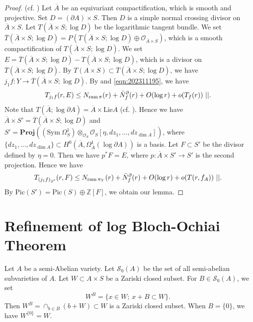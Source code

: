 \documentclass[11pt,english]{smfart}
\theoremstyle{plain}
\theoremstyle{definition}
\theoremstyle{remark}
\numberwithin{equation}{section}
\theoremstyle{plain}
\newcommand{\pN}[1]{\bar{N}_{#1}^{\partial}}
\newcommand{\ram}{{\rm ram}\,}
\begin{document}
	\begin{proof}
		(cf. \cite[Lemma 2]{Yam15})
		Let $\overline{A}$ be an equivariant compactification, which is smooth and projective.
		Set $D=(\partial A)\times S$.
		Then $D$ is a simple normal crossing divisor on $\overline{A}\times S$.
		Let $T(\overline{A}\times S;\log D)$ be the logarithmic tangent bundle.
		We set $\overline{T}(\overline{A}\times S;\log D)=P(T(\overline{A}\times S;\log D)\oplus \mathcal{O}_{\overline{A}\times S})$, which is a smooth compactification of $T(\overline{A}\times S;\log D)$.
		We set $E=\overline{T}(\overline{A}\times S;\log D)-T(\overline{A}\times S;\log D)$, which is a divisor on $\overline{T}(\overline{A}\times S;\log D)$.
		By $T(A\times S)\subset \overline{T}(\overline{A}\times S;\log D)$, we have $j_1f:Y\to \overline{T}(\overline{A}\times S;\log D)$.
		By \cite[(2.4.8)]{Yam04} and \eqref{eqn:202311195}, we have 
		$$
		T_{j_1f}(r,E)\leq N_{\ram \pi}(r)+\pN{f}(r)+O(\log r)+o(T_f(r))\ ||.
		$$ 
		Note that $T(\overline{A};\log\partial A)=\overline{A}\times \mathrm{Lie}A$ (cf. \cite[Prop 5.4.3]{NW13}).
		Hence we have $\overline{A}\times S'=\overline{T}(\overline{A}\times S;\log D)$ and $S'=\mathbf{Proj}((\mathrm{Sym}\ \Omega^1_S)\otimes_{\mathcal{O}_S}\mathcal O_S[\eta,dz_1,\ldots,dz_{\dim A} ])$, where $\{dz_1,\ldots,dz_{\dim A}\}\subset H^0(\overline{A},\Omega^1_{\overline{A}}(\log \partial A))$ is a basis.
		Let $F\subset S'$ be the divisor defined by $\eta=0$.
		Then we have $p^*F=E$, where $p:\overline{A}\times S'\to S'$ is the second projection.
		Hence we have
		$$T_{(j_1f)_{S'}}(r,F)\leq N_{\ram \pi _Y}(r)+\pN{f}(r)+O(\log r)+o(T(r,f_A)) \ ||.$$
		By $\mathrm{Pic}(S')=\mathrm{Pic}(S)\oplus \mathbb Z[F]$, we obtain our lemma.
	\end{proof}
	
	
	
	
	\section{Refinement of log Bloch-Ochiai Theorem}\label{sec:rbc} 
	
	Let $A$ be a semi-Abelian variety.
	Let $\mathcal{S}_0(A)$ be the set of all semi-abelian subvarieties of $A$.
	Let $W\subset A\times S$ be a Zariski closed subset.
	For $B\in \mathcal{S}_0(A)$, we set
	\begin{equation}\label{eqn:20221101}
		W^B=\{ x\in W;\ x+B\subset W\}.
	\end{equation}
	Then $W^B=\cap_{b\in B}(b+W)\subset W$ is a Zariski closed subset.
	When $B=\{0\}$, we have $W^{\{ 0\}}=W$.
	
\end{document}

